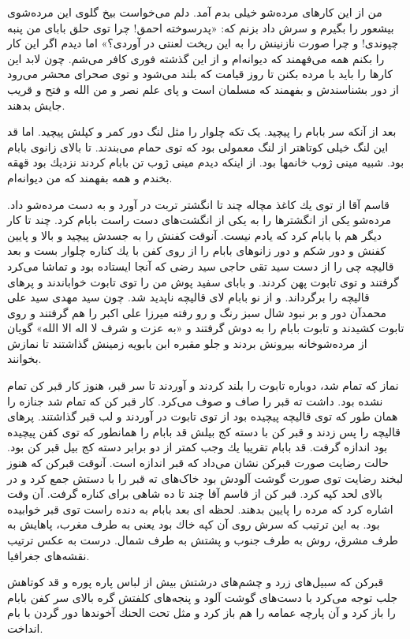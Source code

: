 \documentclass[12pt,a4paper]{book}
\begin{document}
من از این کار‌های مرده‌شو خیلی بدم آمد. دلم می‌خواست بیخ گلوی این مرده‌شوی بیشعور را بگیرم و سرش داد بزنم که: «پدرسوخته احمق! چرا توی حلق بابای من پنبه چپوندی! و چرا صورت نازنینش را به این ریخت لعنتی در آوردی؟» اما دیدم اگر این کار را بکنم همه می‌فهمند که دیوانه‌ام و از این گذشته فوری کافر می‌شم. چون لابد این کارها را باید با مرده بکنن تا روز قیامت که بلند می‌شود و توی صحرای محشر می‌رود از دور بشناسندش و بفهمند که مسلمان است و پای علم نصر و من الله و فتح و قريب جایش بدهند.

بعد از آنکه سر بابام را پیچید. یک تکه چلوار را مثل لنگ دور کمر و کپلش پیچید. اما قد این لنگ خیلی کوتاهتر از لنگ معمولی بود که توی حمام می‌بندند. تا بالای زانوی بابام بود. شبیه مینی ژوب خانمها بود. از اینکه دیدم مینی ژوب تن بابام کردند نزديك بود قهقه بخندم و همه بفهمند که من دیوانه‌ام.

قاسم آقا از توی يك كاغذ مچاله چند تا انگشتر تربت در آورد و به دست مرده‌شو داد. مرده‌شو یکی از انگشترها را به یکی از انگشت‌های دست راست بابام کرد. چند تا کار دیگر هم با بابام کرد که یادم نیست. آنوقت کفنش را به جسدش پیچید و بالا و پایین کفنش و دور شکم و دور زانوهای بابام را از روی کفن با يك كناره چلوار بست و بعد قالیچه چی را از دست سید تقی حاجی سید رضی که آنجا ایستاده بود و تماشا می‌کرد گرفتند و توی تابوت پهن کردند. و بابای سفید پوش من را توی تابوت خواباندند و پرهای قالیچه را برگرداند. و از نو بابام لای قالیچه ناپدید شد. چون سید مهدی سید علی محمدآن دور و بر نبود شال سبز رنگ و رو رفته میرزا علی اکبر را هم گرفتند و روی تابوت کشیدند و تابوت بابام را به دوش گرفتند و «به عزت و شرف لا اله الا الله» گویان از مرده‌شوخانه بیرونش بردند و جلو مقبره ابن بابویه زمینش گذاشتند تا نمازش بخوانند.

نماز که تمام شد، دوباره تابوت را بلند کردند و آوردند تا سر قبر، هنوز کار قبر کن تمام نشده بود. داشت ته قبر را صاف و صوف می‌کرد.
کار قبر کن که تمام شد جنازه را همان طور که توی قالیچه پیچیده بود از توی تابوت در آوردند و لب قبر گذاشتند. پرهای قالیچه را پس زدند و قبر کن با دسته کج بیلش قد بابام را همانطور که توی کفن پیچیده بود اندازه گرفت. قد بابام تقريبا يك وجب کمتر از دو برابر دسته کج بيل قبر کن بود. حالت رضایت صورت قبرکن نشان می‌داد که قبر اندازه است. آنوقت قبرکن که هنوز لبخند رضایت توی صورت گوشت آلودش بود خاک‌های ته قبر را با دستش جمع کرد و در بالای لحد کپه کرد. قبر کن از قاسم آقا چند تا ده شاهی برای کناره گرفت. آن وقت اشاره کرد که مرده را پایین بدهند. لحظه ای بعد بابام به دنده راست توی قبر خوابیده بود. به این ترتیب که سرش روی آن کپه خاك بود یعنی به طرف مغرب، پاهایش به طرف مشرق، روش به طرف جنوب و پشتش به طرف شمال. درست به عکس ترتیب نقشه‌های جغرافيا.

قبرکن که سبیل‌های زرد و چشم‌های درشتش بیش از لباس پاره پوره و قد کوتاهش جلب توجه می‌کرد با دست‌های گوشت آلود و پنجه‌های کلفتش گره بالای سر کفن بابام را باز کرد و آن پارچه عمامه را هم باز کرد و مثل تحت الحنك آخوندها دور گردن با بام انداخت.
\end{document}
